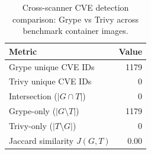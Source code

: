 \begin{table}[htbp]
\centering
\caption{Cross-scanner CVE detection comparison: Grype vs Trivy across benchmark container images.}
\label{tab:scig_scanner_comparison}
\begin{tabular}{lr}
\toprule
\textbf{Metric} & \textbf{Value} \\
\midrule
Grype unique CVE IDs & 1179 \\
Trivy unique CVE IDs & 0 \\
Intersection ($|G \cap T|$) & 0 \\
Grype-only ($|G \setminus T|$) & 1179 \\
Trivy-only ($|T \setminus G|$) & 0 \\
Jaccard similarity $J(G, T)$ & 0.00 \\
\bottomrule
\end{tabular}
\end{table}